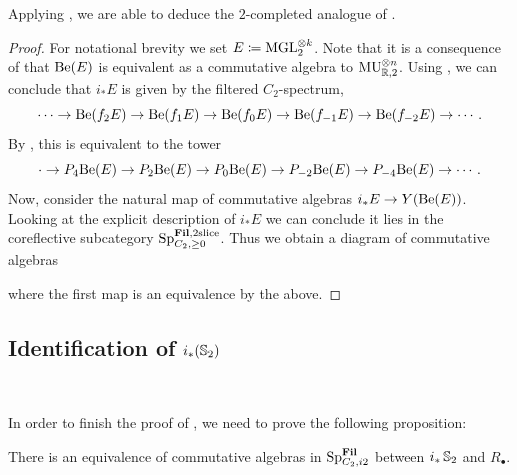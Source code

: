 Applying , we are able to deduce the $2$-completed analogue of %
. 

\begin{proof}
  For notational brevity we set $E \coloneqq \mathrm{MGL}_2^{\otimes k}$.
  Note that it is a consequence of  that $\mathrm{Be} (E) $ is equivalent as a commutative algebra to $\operatorname{\mathrm{MU}}_{\mathbb{R},2}^{\otimes n}$.
  Using , we can conclude that $i_*E$ is given by the filtered $C_2$-spectrum, 
  \[\cdots \to \mathrm{Be} (f_{2} E) \to \mathrm{Be} (f_1 E) \to \mathrm{Be} (f_0 E) \to \mathrm{Be} (f_{-1} E) \to \mathrm{Be} (f_{-2} E) \to \cdots.\]
  By , this is equivalent to the tower
  \[ \cdot \to P_{4} \mathrm{Be} (E) \to P_2 \mathrm{Be} (E) \to P_0 \mathrm{Be} (E) \to P_{-2} \mathrm{Be} (E) \to P_{-4} \mathrm{Be} (E) \to \cdots.\]
  Now, consider the natural map of commutative algebras $i_*E \to Y (\mathrm{Be} (E))$.
  Looking at the explicit description of $i_*E$ we can conclude it lies in the coreflective subcategory $\operatorname{\mathrm{Sp}}_{C_2, \geq 0}^{\operatorname{\mathbf{Fil}}, 2\mathrm{slice}}$. Thus we obtain a diagram of commutative algebras
 \begin{center}  \end{center}
  where the first map is an equivalence by the above.
\end{proof}

\subsection{Identification of $i_* (\operatorname{\mathbb{S}}_2)$}\

In order to finish the proof of , we need to prove the following proposition:

\begin{prop}
  There is an equivalence of commutative algebras in $\operatorname{\mathrm{Sp}}_{C_2,i2}^{\operatorname{\mathbf{Fil}}}$ between $i_*\operatorname{\mathbb{S}}_2$ and $R_\bullet$.
\end{prop}



